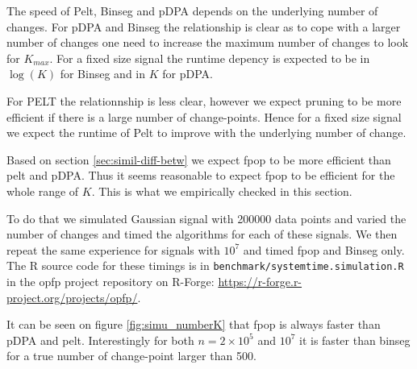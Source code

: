 \documentclass{article}
\begin{document}
The speed of Pelt, Binseg and pDPA depends on the underlying number of changes.
For pDPA and Binseg the relationship is clear as to cope with a larger number of changes
one need to increase the maximum number of changes to look for $K_{max}$. 
For a fixed size signal the runtime depency is expected to be in $\log(K)$ for Binseg and
in $K$ for pDPA.

For PELT the relationnship is less clear, however we expect pruning to be more efficient
if there is a large number of change-points. Hence for a fixed size signal we expect 
the runtime of Pelt to improve with the underlying number of change.

Based on section \ref{sec:simil-diff-betw} we expect fpop to be more efficient than pelt and pDPA.
Thus it seems reasonable to expect fpop to be efficient for the whole range of $K$. 
This is what we empirically checked in this section.

To do that we simulated Gaussian signal with 200000 data points and varied the number of changes
and timed the algorithms for each of these signals. We then repeat the same experience for signals with $10^7$ and timed fpop and Binseg only.
The R source code
for these timings is in \verb|benchmark/systemtime.simulation.R| in
the opfp project repository on R-Forge: \url{https://r-forge.r-project.org/projects/opfp/}.

It can be seen on figure \ref{fig:simu_numberK} that fpop is always faster than pDPA and pelt. 
Interestingly for both $n=2\times 10^5$ and $10^7$ it is faster than binseg for a true number of change-point larger than 500.
\end{document}
